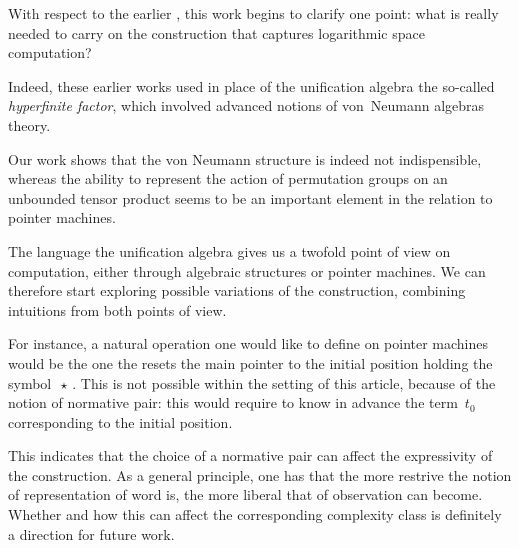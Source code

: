 With respect to the earlier \cite{girard_normativity_2012,aubert_characterizing_2012,seiller_logarithmic_2013},
this work begins to clarify one point: what is really needed to carry on the construction that captures logarithmic space computation?

Indeed, these earlier works used in place of the unification algebra the so-called \emph{hyperfinite factor},
which involved advanced notions of von~Neumann algebras theory.

Our work shows that the von Neumann structure is indeed not indispensible,
whereas the ability to represent the action of permutation groups on an unbounded tensor product seems to be an important element in the relation to pointer machines.

\smallskip
The language the unification algebra gives us a twofold point of view on computation, either through algebraic structures or pointer machines. We can therefore start exploring possible variations of the construction, combining intuitions from both points of view.

For instance, a natural operation one would like to define on pointer machines would be the one the resets the main pointer to the initial position holding the symbol $\,\star\,$.
This is not possible within the setting of this article, because of the notion of normative pair:
this would require to know in advance the term $\,t_0\,$ corresponding to the initial position.

\smallskip
This indicates that the choice of a normative pair can affect the expressivity of the construction.
As a general principle, one has that the more restrive the notion of representation of word is,
the more liberal that of observation can become.
Whether and how this can affect the corresponding complexity class is definitely a direction for future work.
